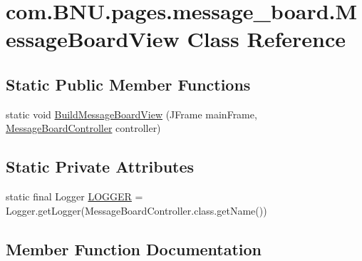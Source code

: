 \hypertarget{classcom_1_1_b_n_u_1_1pages_1_1message__board_1_1_message_board_view}{}\section{com.\+B\+N\+U.\+pages.\+message\+\_\+board.\+Message\+Board\+View Class Reference}
\label{classcom_1_1_b_n_u_1_1pages_1_1message__board_1_1_message_board_view}
\subsection*{Static Public Member Functions}
\begin{DoxyCompactItemize}
\item 
static void \mbox{\hyperlink{classcom_1_1_b_n_u_1_1pages_1_1message__board_1_1_message_board_view_a338b4855b002a60ff853aeba041aed5f}{Build\+Message\+Board\+View}} (J\+Frame main\+Frame, \mbox{\hyperlink{classcom_1_1_b_n_u_1_1pages_1_1message__board_1_1_message_board_controller}{Message\+Board\+Controller}} controller)
\end{DoxyCompactItemize}
\subsection*{Static Private Attributes}
\begin{DoxyCompactItemize}
\item 
static final Logger \mbox{\hyperlink{classcom_1_1_b_n_u_1_1pages_1_1message__board_1_1_message_board_view_a8cb5ec8649c5ae123b5e9fffb85152e5}{L\+O\+G\+G\+ER}} = Logger.\+get\+Logger(Message\+Board\+Controller.\+class.\+get\+Name())
\end{DoxyCompactItemize}


\subsection{Member Function Documentation}
\mbox{\label{classcom_1_1_b_n_u_1_1pages_1_1message__board_1_1_message_board_view_a338b4855b002a60ff853aeba041aed5f}} 
